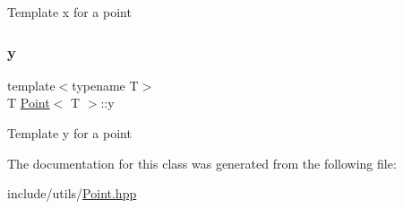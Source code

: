 Template x for a point \mbox{\label{classPoint_a65146418a33ebb2cd9acb85cade60ac9}} 
\subsubsection{\texorpdfstring{y}{y}}
{\footnotesize\ttfamily template$<$typename T$>$ \\
T \hyperlink{classPoint}{Point}$<$ T $>$\+::y}

Template y for a point 

The documentation for this class was generated from the following file\+:\begin{DoxyCompactItemize}
\item 
include/utils/\hyperlink{Point_8hpp}{Point.\+hpp}\end{DoxyCompactItemize}
